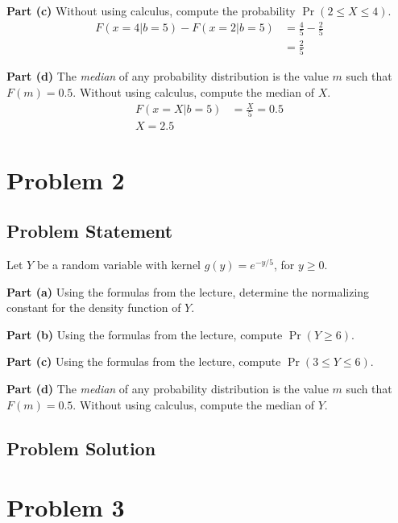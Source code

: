 \documentclass[12pt]{article}
\theoremstyle{definition}
\begin{document}
\bigskip
\noindent
{\bf Part (c)} Without using calculus, compute the probability $\Pr(2 \leq X \leq 4)$.
\begin{align*}
F(x=4|b=5) - F(x=2|b=5) &= \frac{4}{5} - \frac{2}{5}\\
&= \frac{2}{5}
\end{align*}

\bigskip
\noindent
{\bf Part (d)} The {\em median} of any probability distribution is the value $m$ such that $F(m) = 0.5$. Without using calculus, compute the median of $X$.
\begin{align*}
F(x=X|b=5) &= \frac{X}{5} = 0.5\\
X = 2.5
\end{align*}


\newpage
\section*{Problem 2}

\subsection*{Problem Statement}

Let $Y$ be a random variable with kernel $g(y) = e^{-y/5}$, for $y \geq 0$.

\bigskip
\noindent
{\bf Part (a)} Using the formulas from the lecture, determine the normalizing constant for the density function of $Y$.

\bigskip
\noindent
{\bf Part (b)} Using the formulas from the lecture, compute $\Pr( Y \geq 6)$.

\bigskip
\noindent
{\bf Part (c)} Using the formulas from the lecture, compute $\Pr( 3 \leq Y \leq 6)$.


\bigskip
\noindent
{\bf Part (d)} The {\em median} of any probability distribution is the value $m$ such that $F(m) = 0.5$. Without using calculus, compute the median of $Y$.






\subsection*{Problem Solution}



\newpage
\section*{Problem 3}
\end{document}
